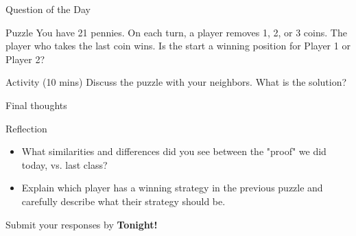 \documentclass{beamer}
\begin{document}
\begin{frame}{Question of the Day}
\pause
  \begin{block}{Puzzle}
    You have 21 pennies. On each turn, a player removes 1, 2, or 3 coins.  The player who takes the last coin wins. 
    Is the start a winning position for {\color{blue}Player 1} or {\color{red}Player 2}?
  \end{block}
\pause
  \begin{block}{Activity (10 mins)}
    Discuss the puzzle with your neighbors.  What is the solution?
  \end{block}
\end{frame}

\begin{frame}{Final thoughts}
  \begin{block}{Reflection}
    \begin{itemize}
      \item What similarities and differences did you see between the "proof" we did today, vs. last class?
      \item Explain which player has a winning strategy in the previous puzzle and carefully describe what their strategy should be.
    \end{itemize}
  \end{block}
\begin{center}
Submit your responses by \textbf{Tonight!}
\end{center}
\end{frame}
\end{document}
